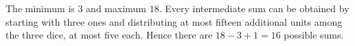 The minimum is $3$ and maximum $18$. Every intermediate sum can be obtained by starting with three ones and distributing at most fifteen additional units among the three dice, at most five each. Hence there are $18-3+1=\boxed{16}$ possible sums.
